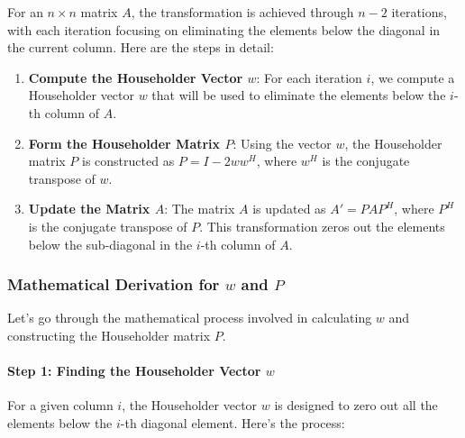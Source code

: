 \documentclass[journal,12pt,onecolumn]{IEEEtran}
\theoremstyle{remark}
\begin{document}
For an \( n \times n \) matrix \( A \), the transformation is achieved through \( n-2 \) iterations, with each iteration focusing on eliminating the elements below the diagonal in the current column. Here are the steps in detail:

\begin{enumerate}
	\item \textbf{Compute the Householder Vector \( w \)}: For each iteration \( i \), we compute a Householder vector \( w \) that will be used to eliminate the elements below the \( i \)-th column of \( A \).
	\item \textbf{Form the Householder Matrix \( P \)}: Using the vector \( w \), the Householder matrix \( P \) is constructed as \( P = I - 2w w^H \), where \( w^H \) is the conjugate transpose of \( w \).
	\item \textbf{Update the Matrix \( A \)}: The matrix \( A \) is updated as \( A' = P A P^H \), where \( P^H \) is the conjugate transpose of \( P \). This transformation zeros out the elements below the sub-diagonal in the \( i \)-th column of \( A \). \\
\end{enumerate}

\subsubsection*{Mathematical Derivation for \( w \) and \( P \)}

Let's go through the mathematical process involved in calculating \( w \) and constructing the Householder matrix \( P \).

\paragraph{Step 1: Finding the Householder Vector \( w \)}

For a given column \( i \), the Householder vector \( w \) is designed to zero out all the elements below the \( i \)-th diagonal element. Here's the process:
\end{document}
